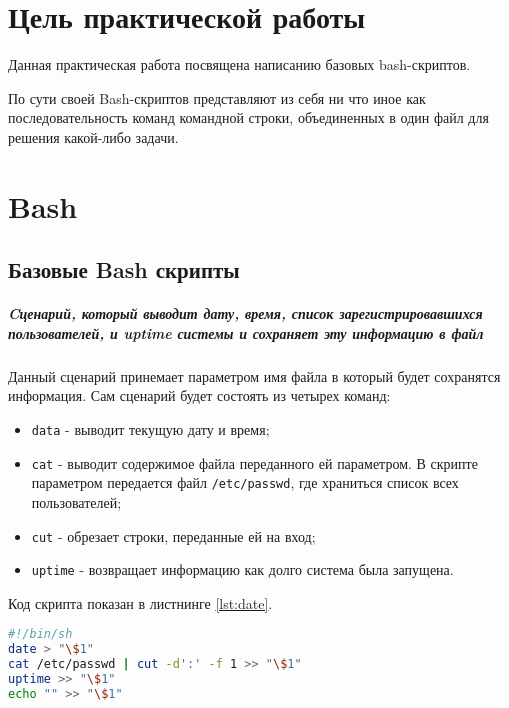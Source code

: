 \graphicspath{{~/Documents/SADT/SecondTask/}}
\chapter*{\LARGE{Цель практической работы}}
Данная практическая работа посвящена написанию базовых bash-скриптов.

По сути своей Bash-скриптов представляют из себя ни что иное как
последовательность команд командной строки, объединенных в один файл
для решения какой-либо задачи.

\chapter{Bash}
\section{Базовые Bash скрипты}
\paragraph{Cценарий, который выводит дату, время, список
зарегистрировавшихся пользователей, и uptime системы и сохраняет
эту информацию в файл}\mbox{}\par
Данный сценарий принемает параметром имя файла в который будет сохранятся
информация. Сам сценарий будет состоять из четырех команд:
\begin{itemize}
	\item \texttt{data} - выводит текущую дату и время;
	\item \texttt{cat} - выводит содержимое файла переданного ей параметром.
		В скрипте параметром передается файл \texttt{/etc/passwd},
		где храниться список всех пользователей;
	\item \texttt{cut} - обрезает строки, переданные ей на вход;
	\item \texttt{uptime} - возвращает информацию как долго система
		была запущена.
\end{itemize}
Код скрипта показан в листнинге \ref{lst:date}.

\begin{lstlisting}[language=Bash
	, caption=\leftline{Код скрипта}
	, label=lst:date]
#!/bin/sh
date > "\$1"
cat /etc/passwd | cut -d':' -f 1 >> "\$1"
uptime >> "\$1"
echo "" >> "\$1"
\end{lstlisting}

